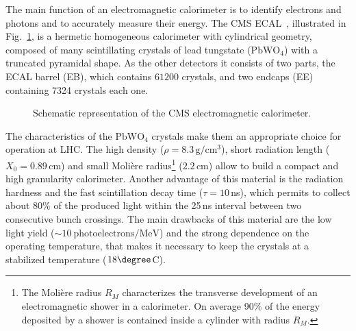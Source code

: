 The main function of an electromagnetic calorimeter is to identify electrons and photons and to accurately measure their energy. The CMS ECAL~\cite{ecal,Bloch:581342}, illustrated in Fig.~\ref{fig:ecal}, is a hermetic homogeneous calorimeter with cylindrical geometry, composed of many scintillating crystals of lead tungstate ($\mathrm{PbWO_4}$) with a truncated pyramidal shape. As the other detectors it consists of two parts, the ECAL barrel (EB), which contains $61200$ crystals, and two endcaps (EE) containing 7324 crystals each one.

\begin{figure}[htb]
\centering
{}
\caption{Schematic representation of the CMS electromagnetic calorimeter.}\label{fig:ecal}
\end{figure}

The characteristics of the $\mathrm{PbWO_4}$ crystals make them an appropriate choice for operation at LHC. The high density ($\rho=8.3\,\mathrm{g/cm^3}$), short radiation length ($X_0 = 0.89\,\mathrm{cm}$) and small Moli\`ere radius\footnote{The Moli\`ere radius $R_M$ characterizes the transverse development of an electromagnetic shower in a calorimeter. On average 90\% of the energy deposited by a shower is contained inside a cylinder with radius $R_M$.} ($2.2$\,cm) allow to build a compact and high granularity calorimeter. Another advantage of this material is the radiation hardness and the fast scintillation decay time ($\tau = 10$\,ns), which permits to collect about 80\% of the produced light within the 25\,ns interval between two consecutive bunch crossings. The main drawbacks of this material are the low light yield ($\sim 10~\mathrm{photoelectrons/MeV}$) and the strong dependence on the operating temperature, that makes it necessary to keep the crystals at a stabilized temperature ($18\degree$C).

